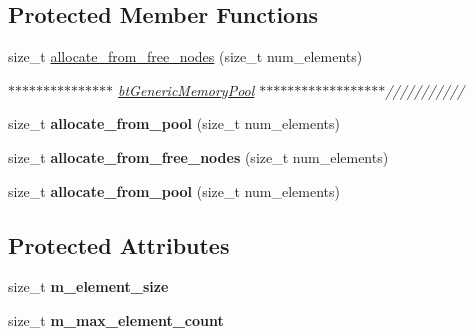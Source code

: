 \subsection*{Protected Member Functions}
\begin{DoxyCompactItemize}
\item 
\mbox{\label{classbtGenericMemoryPool_ab3d627fdeb0178314779ba9b2361462a}} 
size\+\_\+t \hyperlink{classbtGenericMemoryPool_ab3d627fdeb0178314779ba9b2361462a}{allocate\+\_\+from\+\_\+free\+\_\+nodes} (size\+\_\+t num\+\_\+elements)
\begin{DoxyCompactList}\small\item\em $\ast$$\ast$$\ast$$\ast$$\ast$$\ast$$\ast$$\ast$$\ast$$\ast$$\ast$$\ast$$\ast$$\ast$$\ast$ \hyperlink{classbtGenericMemoryPool}{bt\+Generic\+Memory\+Pool} $\ast$$\ast$$\ast$$\ast$$\ast$$\ast$$\ast$$\ast$$\ast$$\ast$$\ast$$\ast$$\ast$$\ast$$\ast$$\ast$$\ast$$\ast$/////////// \end{DoxyCompactList}\item 
\mbox{\label{classbtGenericMemoryPool_a5ca2a7e3843e47c17fa6895660973762}} 
size\+\_\+t {\bfseries allocate\+\_\+from\+\_\+pool} (size\+\_\+t num\+\_\+elements)
\item 
\mbox{\label{classbtGenericMemoryPool_ab3d627fdeb0178314779ba9b2361462a}} 
size\+\_\+t {\bfseries allocate\+\_\+from\+\_\+free\+\_\+nodes} (size\+\_\+t num\+\_\+elements)
\item 
\mbox{\label{classbtGenericMemoryPool_a5ca2a7e3843e47c17fa6895660973762}} 
size\+\_\+t {\bfseries allocate\+\_\+from\+\_\+pool} (size\+\_\+t num\+\_\+elements)
\end{DoxyCompactItemize}
\subsection*{Protected Attributes}
\begin{DoxyCompactItemize}
\item 
\mbox{\label{classbtGenericMemoryPool_adef7196875ab9313fcc14c7acd3d4d23}} 
size\+\_\+t {\bfseries m\+\_\+element\+\_\+size}
\item 
\mbox{\label{classbtGenericMemoryPool_acf9481d6fe8842b6f0b58e6c1729863e}} 
size\+\_\+t {\bfseries m\+\_\+max\+\_\+element\+\_\+count}
\end{DoxyCompactItemize}


